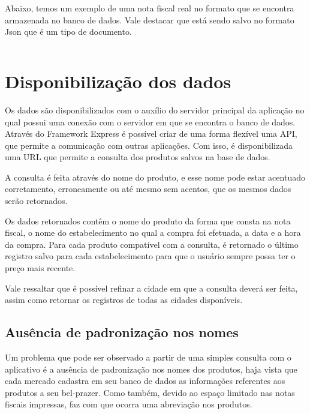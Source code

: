 Abaixo, temos um exemplo de uma nota fiscal real no formato que se encontra armazenada no banco de dados. Vale destacar que está sendo salvo no formato Json que é um tipo de documento.

\inputminted{octave}{exemplo-nfce.json}

\newpage
\section{Disponibilização dos dados}



Os dados são disponibilizados com o auxílio do servidor principal da aplicação no qual possui uma conexão com o servidor em que se encontra o banco de dados. Através do Framework Express é possível criar de uma forma flexível uma API, que permite a comunicação com outras aplicações. Com isso, é disponibilizada uma URL que permite a consulta dos produtos salvos na base de dados.

A consulta é feita através do nome do produto, e esse nome pode estar acentuado corretamento, erroneamente ou até mesmo sem acentos, que os mesmos dados serão retornados.

Os dados retornados contêm o nome do produto da forma que consta na nota fiscal, o nome do estabelecimento no qual a compra foi efetuada, a data e a hora da compra. Para cada produto compatível com a consulta, é retornado o último registro salvo para cada estabelecimento para que o usuário sempre possa ter o preço mais recente.

Vale ressaltar que é possível refinar a cidade em que a consulta deverá ser feita, assim como retornar os registros de todas as cidades disponíveis.

\subsection{Ausência de padronização nos nomes}

Um problema que pode ser observado a partir de uma simples consulta com o aplicativo é a ausência de padronização nos nomes dos produtos, haja vista que cada mercado cadastra em seu banco de dados as informações referentes aos produtos a seu bel-prazer. Como também, devido ao espaço limitado nas notas fiscais impressas, faz com que ocorra uma abreviação nos produtos.

